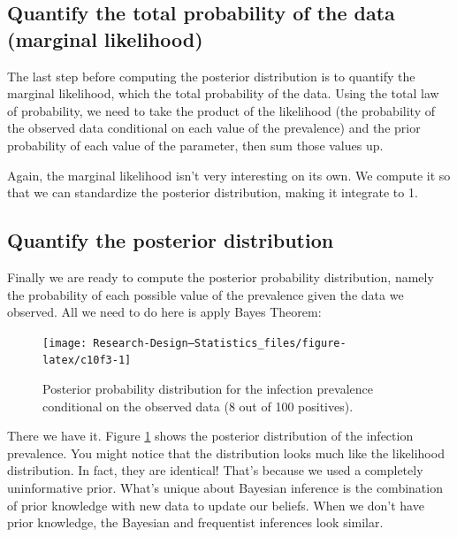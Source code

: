 \documentclass[
]{book}
\newenvironment{Shaded}{\begin{snugshade}}{\end{snugshade}}
\newcommand{\NormalTok}[1]{#1}
\newcommand{\OtherTok}[1]{\textcolor[rgb]{0.56,0.35,0.01}{#1}}
\newcommand{\SpecialCharTok}[1]{\textcolor[rgb]{0.81,0.36,0.00}{\textbf{#1}}}
\begin{document}
\subsection{Quantify the total probability of the data (marginal likelihood)}\label{quantify-the-total-probability-of-the-data-marginal-likelihood}

The last step before computing the posterior distribution is to quantify the marginal likelihood, which the total probability of the data. Using the total law of probability, we need to take the product of the likelihood (the probability of the observed data conditional on each value of the prevalence) and the prior probability of each value of the parameter, then sum those values up.

\begin{Shaded}
\end{Shaded}

Again, the marginal likelihood isn't very interesting on its own. We compute it so that we can standardize the posterior distribution, making it integrate to 1.

\subsection{Quantify the posterior distribution}\label{quantify-the-posterior-distribution}

Finally we are ready to compute the posterior probability distribution, namely the probability of each possible value of the prevalence given the data we observed. All we need to do here is apply Bayes Theorem:

\begin{figure}

{\centering \texttt{[image: Research-Design---Statistics\_files/figure-latex/c10f3-1]} 

}

\caption{Posterior probability distribution for the infection prevalence conditional on the observed data (8 out of 100 positives).}\label{fig:c10f3}
\end{figure}

There we have it. Figure \ref{fig:c10f3} shows the posterior distribution of the infection prevalence. You might notice that the distribution looks much like the likelihood distribution. In fact, they are identical! That's because we used a completely uninformative prior. What's unique about Bayesian inference is the combination of prior knowledge with new data to update our beliefs. When we don't have prior knowledge, the Bayesian and frequentist inferences look similar.
\end{document}
